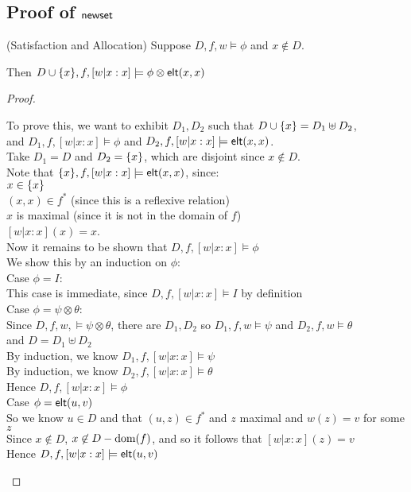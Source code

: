\subsection{Proof of $\mathsf{newset}$}

\begin{lemma}{(Satisfaction and Allocation)}
Suppose $D, f, w \models \phi$ and $x \not \in D$. 

Then $D \cup \{{x}\}, f, [w|x:x] \models \phi \otimes \mathsf{elt}({x}, {x})$
\end{lemma}

\begin{proof}
\begin{tabbedproof}
\oo To prove this, we want to exhibit $D_1, D_2$ such that $D \cup \{{x}\} = D_1 \uplus D_2$, \\
\ox and $D_1, f, [w|x:x] \models \phi$ and $D_2, f, [w|x:x] \models \mathsf{elt}({x}, {x})$. \\ 
\oo Take $D_1 = D$ and $D_2 = \{{x}\}$, which are disjoint since $x \not\in D$. \\ 
\oo Note that $\{{x}\}, f, [w|x:x] \models \mathsf{elt}({x}, {x})$, since:  \\
\oox $x \in \{{x}\}$  \\
\oox $(x, x) \in f^*$ (since this is a reflexive relation) \\
\oox $x$ is maximal (since it is not in the domain of $f$) \\
\oox $[w|x:x](x) = x$. \\
\oo Now it remains to be shown that $D, f, [w|x:x] \models \phi$ \\
\oo We show this by an induction on $\phi$:  \\
\ooo Case $\phi = I$:\\ 
\oooo This case is immediate, since $D, f, [w|x:x] \models I$ by definition \\ 
\ooo Case $\phi = \psi \otimes \theta$: \\    
\oooo Since $D, f, w, \models \psi \otimes \theta$, there are $D_1, D_2$ so $D_1, f, w \models \psi$ and $D_2, f, w \models \theta$ \\
\ooox and $D = D_1 \uplus D_2$ \\
\oooo By induction, we know $D_1, f, [w|x:x] \models \psi$ \\ 
\oooo By induction, we know $D_2, f, [w|x:x] \models \theta$ \\
\oooo Hence $D, f, [w|x:x] \models \phi$ \\
\ooo Case $\phi = \mathsf{elt}({u}, {v})$ \\
\oooo So we know $u \in D$ and that $(u,z) \in f^{*}$ and $z$ maximal and $w(z) = v$ for some $z$ \\
\oooo Since $x \not \in D$, $x \not\in D - \mbox{dom}({f})$, and so it follows that $[w|x:x](z) = v$ \\
\oooo Hence $D, f, [w|x:x] \models \mathsf{elt}({u}, {v})$ 
\end{tabbedproof}
\end{proof}


